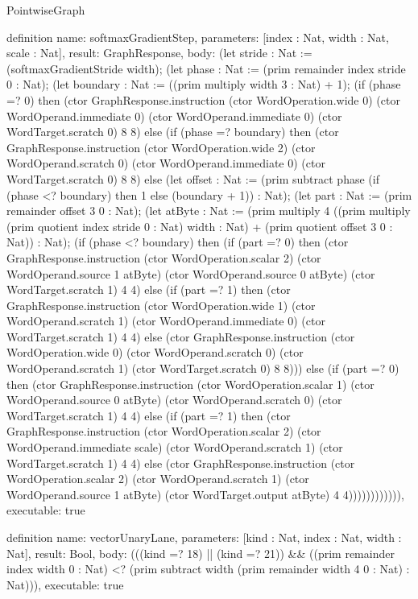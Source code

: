 \begin{lexlean}{PointwiseGraph}
\begin{semanticmodule}
definition{
  name: softmaxGradientStep,
  parameters: [index : Nat, width : Nat, scale : Nat],
  result: GraphResponse,
  body: (let stride : Nat := (softmaxGradientStride width); (let phase : Nat := (prim remainder index stride 0 : Nat); (let boundary : Nat := ((prim multiply width 3 : Nat) + 1); (if (phase =? 0) then (ctor GraphResponse.instruction (ctor WordOperation.wide 0) (ctor WordOperand.immediate 0) (ctor WordOperand.immediate 0) (ctor WordTarget.scratch 0) 8 8) else (if (phase =? boundary) then (ctor GraphResponse.instruction (ctor WordOperation.wide 2) (ctor WordOperand.scratch 0) (ctor WordOperand.immediate 0) (ctor WordTarget.scratch 0) 8 8) else (let offset : Nat := (prim subtract phase (if (phase <? boundary) then 1 else (boundary + 1)) : Nat); (let part : Nat := (prim remainder offset 3 0 : Nat); (let atByte : Nat := (prim multiply 4 ((prim multiply (prim quotient index stride 0 : Nat) width : Nat) + (prim quotient offset 3 0 : Nat)) : Nat); (if (phase <? boundary) then (if (part =? 0) then (ctor GraphResponse.instruction (ctor WordOperation.scalar 2) (ctor WordOperand.source 1 atByte) (ctor WordOperand.source 0 atByte) (ctor WordTarget.scratch 1) 4 4) else (if (part =? 1) then (ctor GraphResponse.instruction (ctor WordOperation.wide 1) (ctor WordOperand.scratch 1) (ctor WordOperand.immediate 0) (ctor WordTarget.scratch 1) 4 4) else (ctor GraphResponse.instruction (ctor WordOperation.wide 0) (ctor WordOperand.scratch 0) (ctor WordOperand.scratch 1) (ctor WordTarget.scratch 0) 8 8))) else (if (part =? 0) then (ctor GraphResponse.instruction (ctor WordOperation.scalar 1) (ctor WordOperand.source 0 atByte) (ctor WordOperand.scratch 0) (ctor WordTarget.scratch 1) 4 4) else (if (part =? 1) then (ctor GraphResponse.instruction (ctor WordOperation.scalar 2) (ctor WordOperand.immediate scale) (ctor WordOperand.scratch 1) (ctor WordTarget.scratch 1) 4 4) else (ctor GraphResponse.instruction (ctor WordOperation.scalar 2) (ctor WordOperand.scratch 1) (ctor WordOperand.source 1 atByte) (ctor WordTarget.output atByte) 4 4)))))))))))),
  executable: true
}

definition{
  name: vectorUnaryLane,
  parameters: [kind : Nat, index : Nat, width : Nat],
  result: Bool,
  body: (((kind =? 18) || (kind =? 21)) && ((prim remainder index width 0 : Nat) <? (prim subtract width (prim remainder width 4 0 : Nat) : Nat))),
  executable: true
}


\end{semanticmodule}
\end{lexlean}
